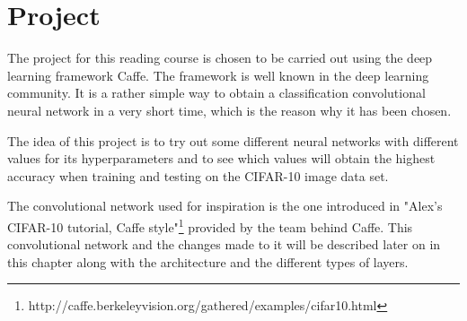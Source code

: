 \graphicspath{{Chapters/Project/}}

\chapter{Project}

The project for this reading course is chosen to be carried out using the deep
learning framework Caffe. The framework is well known in the deep learning
community. It is a rather simple way to obtain a classification convolutional
neural network in a very short time, which is the reason why it has been chosen.

The idea of this project is to try out some different neural networks with
different values for its hyperparameters and to see which values will obtain
the highest accuracy when training and testing on the CIFAR-10 image data set.

The convolutional network used for inspiration is the one introduced in "Alex's
CIFAR-10 tutorial, Caffe
style"\footnote{http://caffe.berkeleyvision.org/gathered/examples/cifar10.html}
provided by the team behind Caffe. This convolutional network and the changes
made to it will be described later on in this chapter along with the
architecture and the different types of layers.








